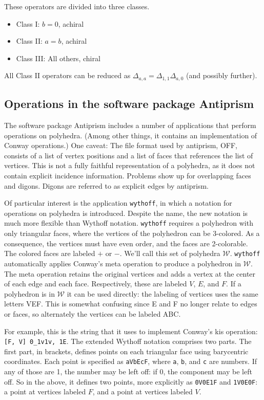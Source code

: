 \documentclass{amsart}[12pt]
\begin{document}
These operators are divided into three classes.
\begin{itemize}
  \item Class I: $b = 0$, achiral
  \item Class II: $a = b$, achiral
  \item Class III: All others, chiral
\end{itemize}
All Class II operators can be reduced as
$\Delta_{a,a} = \Delta_{1,1}\Delta_{a,0}$ (and possibly further).

\subsection{Operations in the software package Antiprism}

The software package Antiprism \cite{antiprism} includes a number of
applications that perform operations on polyhedra. (Among other things, it
contains an implementation of Conway operations.) One caveat: The file format
used by antiprism, OFF, consists of a list of vertex positions and a list of
faces that references the list of vertices. This is not a fully faithful
representation of a polyhedra, as it does not contain explicit incidence
information. Problems show up for overlapping faces and digons. Digons are
referred to as explicit edges by antiprism.

Of particular interest is the application \texttt{wythoff}, in which a notation
for operations on polyhedra is introduced. Despite the name, the new notation is
much more flexible than Wythoff notation.
\texttt{wythoff} requires a polyhedron with only triangular faces, where the
vertices of the polyhedron can be 3-colored. As a consequence, the vertices must
have even order, and the faces are 2-colorable. The colored faces are labeled
$+$ or $-$. We'll call this set of polyhedra $\mathcal{W}$. \texttt{wythoff}
automatically applies Conway's meta operation to produce a polyhedron in
$\mathcal{W}$. The meta operation retains the original vertices and adds a
vertex at the center of each edge and each face. Respectively, these are labeled
$V$, $E$, and $F$. If a polyhedron is in $\mathcal{W}$ it can be used directly:
the labeling of vertices uses the same letters VEF. This is somewhat confusing since E and F no longer relate to edges or faces, so alternately the vertices
can be labeled ABC.

For example, this is the string that it uses to implement Conway's kis
operation: \texttt{[F, V] 0\_1v1v, 1E}. The extended Wythoff notation comprises
two parts. The first part, in brackets, defines points on each triangular face
using barycentric coordinates. Each point is specified as \texttt{aVbEcF}, where
\texttt{a}, \texttt{b}, and \texttt{c} are numbers. If any of those are 1, the
number may be left off: if 0, the component may be left off. So in the above,
it defines two points, more explicitly as \texttt{0V0E1F} and \texttt{1V0E0F}:
a point at vertices labeled $F$, and a point at vertices labeled $V$.
\end{document}
